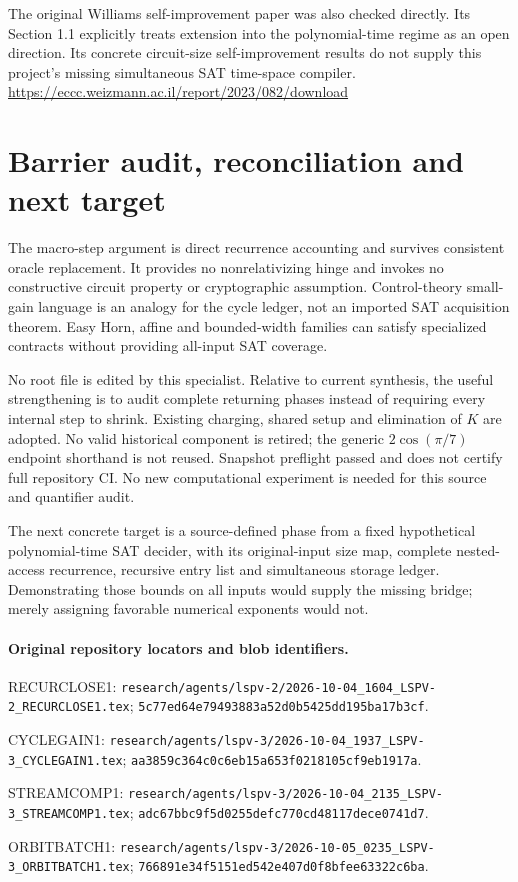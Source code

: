 \documentclass[11pt]{article}
\begin{document}
The original Williams self-improvement paper was also checked directly.
Its Section 1.1 explicitly treats extension into the polynomial-time regime
as an open direction. Its concrete circuit-size self-improvement results do
not supply this project's missing simultaneous SAT time-space compiler.
\url{https://eccc.weizmann.ac.il/report/2023/082/download}

\section{Barrier audit, reconciliation and next target}
The macro-step argument is direct recurrence accounting and survives consistent
oracle replacement. It provides no nonrelativizing hinge and invokes no
constructive circuit property or cryptographic assumption. Control-theory
small-gain language is an analogy for the cycle ledger, not an imported SAT
acquisition theorem. Easy Horn, affine and bounded-width families can satisfy
specialized contracts without providing all-input SAT coverage.

No root file is edited by this specialist. Relative to current synthesis, the
useful strengthening is to audit complete returning phases instead of requiring
every internal step to shrink. Existing charging, shared setup and elimination
of $K$ are adopted. No valid historical component is retired; the generic
$2\cos(\pi/7)$ endpoint shorthand is not reused. Snapshot preflight passed and
does not certify full repository CI. No new computational experiment is
needed for this source and quantifier audit.

The next concrete target is a source-defined phase from a fixed hypothetical
polynomial-time SAT decider, with its original-input size map, complete
nested-access recurrence, recursive entry list and simultaneous storage ledger.
Demonstrating those bounds on all inputs would supply the missing bridge;
merely assigning favorable numerical exponents would not.

\paragraph{Original repository locators and blob identifiers.}
\begin{description}\small
\item[] RECURCLOSE1:
\texttt{research/agents/lspv-2/2026-10-04\_1604\_LSPV-2\_RECURCLOSE1.tex};
\texttt{5c77ed64e79493883a52d0b5425dd195ba17b3cf}.
\item[] CYCLEGAIN1:
\texttt{research/agents/lspv-3/2026-10-04\_1937\_LSPV-3\_CYCLEGAIN1.tex};
\texttt{aa3859c364c0c6eb15a653f0218105cf9eb1917a}.
\item[] STREAMCOMP1:
\texttt{research/agents/lspv-3/2026-10-04\_2135\_LSPV-3\_STREAMCOMP1.tex};
\texttt{adc67bbc9f5d0255defc770cd48117dece0741d7}.
\item[] ORBITBATCH1:
\texttt{research/agents/lspv-3/2026-10-05\_0235\_LSPV-3\_ORBITBATCH1.tex};
\texttt{766891e34f5151ed542e407d0f8bfee63322c6ba}.
\end{description}
\end{document}
